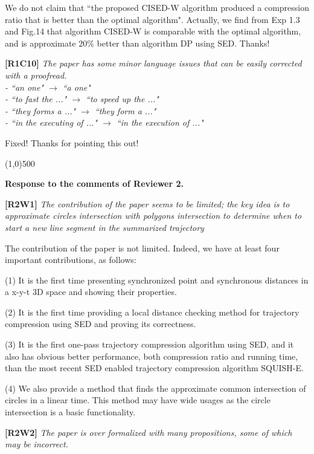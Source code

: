 \documentclass{letter}
\begin{document}
We do not claim that ``the proposed CISED-W algorithm produced a compression ratio that is better than the optimal algorithm".
Actually, we find from Exp 1.3 and Fig.14 that algorithm CISED-W is comparable with the optimal algorithm, and is approximate $20\%$ better than algorithm DP using SED. 
Thanks!

\textbf{[R1C10]} \emph{The paper has some minor language issues that can be easily corrected with a proofread.\\
- ``an one" $\rightarrow$ ``a one" \\
- ``to fast the ..." $\rightarrow$ ``to speed up the ..." \\
- ``they forms a ..." $\rightarrow$ ``they form a ..."	\\
- ``in the executing of ..." $\rightarrow$ ``in the execution of ..."
}


Fixed! Thanks for pointing this out!

\line(1,0){500}

\textbf{Response to the comments of Reviewer 2.}

\textbf{[R2W1]} \emph{The contribution of the paper seems to be limited; the key idea is to approximate circles intersection with polygons intersection to determine when to start a new line segment in the summarized trajectory}

The contribution of the paper is not limited. Indeed, we have at least four important contributions, as follows:

(1) It is the first time presenting synchronized point and synchronous distances in a x-y-t 3D space and showing their properties.

(2) It is the first time providing a local distance checking method for trajectory compression using SED and proving its correctness.

(3) It is the first one-pass trajectory compression algorithm using SED, and it also has obvious better performance, both compression ratio and running time, than the most recent SED enabled trajectory compression algorithm SQUISH-E. 

(4) We also provide a method that finds the approximate common intersection of circles in a linear time. This method may have wide usages as the circle intersection is a basic functionality.

\textbf{[R2W2]} \emph{The paper is over formalized with many propositions, some of which may be incorrect.}
\end{document}
